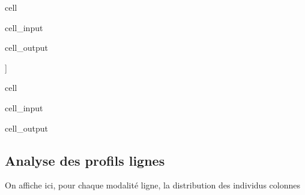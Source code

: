 \documentclass[letterpaper,10pt,french]{sphinxmanual}
\begin{document}
\begin{sphinxuseclass}{cell}
\begin{sphinxuseclass}{cell_input}
\begin{sphinxVerbatim}[commandchars=\\\{\}]
\end{sphinxVerbatim}

\end{sphinxuseclass}
\begin{sphinxuseclass}{cell_output}
\begin{sphinxVerbatim}[commandchars=\\\{\}]
[[1.38572868e\PYGZhy{}02 7.21068498e\PYGZhy{}03 8.24731391e\PYGZhy{}04 3.03851641e\PYGZhy{}04
  8.26930155e\PYGZhy{}05]
 [6.21981806e+01 3.23650288e+01 3.70179190e+00 1.36383258e+00
  3.71166101e\PYGZhy{}01]
 [6.21981806e+01 9.45632094e+01 9.82650013e+01 9.96288339e+01
  1.00000000e+02]]
\end{sphinxVerbatim}

\end{sphinxuseclass}
\end{sphinxuseclass}
\begin{sphinxuseclass}{cell}
\begin{sphinxuseclass}{cell_input}
\begin{sphinxVerbatim}[commandchars=\\\{\}]
\end{sphinxVerbatim}

\end{sphinxuseclass}
\begin{sphinxuseclass}{cell_output}
\noindent{}

\end{sphinxuseclass}
\end{sphinxuseclass}

\subsection{Analyse des profils lignes}
\label{\detokenize{TP3_AFC_ACM:analyse-des-profils-lignes}}
\sphinxAtStartPar
On affiche ici, pour chaque modalité ligne, la distribution des individus colonnes
\end{document}
